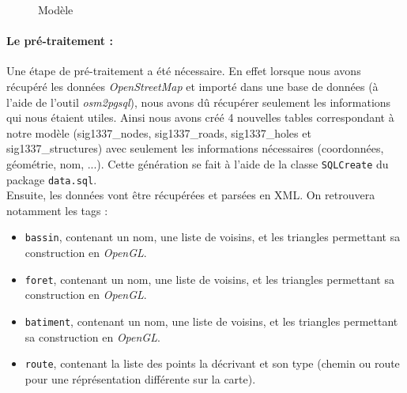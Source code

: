 \documentclass[12pt,a4paper,oneside]{article}
\begin{document}
\begin{figure}[H]
\centering
{}
\caption{Modèle}
\end{figure}

\paragraph{Le pré-traitement : \\}
Une étape de pré-traitement a été nécessaire. En effet lorsque nous avons récupéré les données \textit{OpenStreetMap} et importé dans une base de données (à l'aide de l'outil \textit{osm2pgsql}), nous avons dû récupérer seulement les informations qui nous étaient utiles. Ainsi nous avons créé 4 nouvelles tables correspondant à notre modèle (sig1337\_nodes, sig1337\_roads, sig1337\_holes et sig1337\_structures) avec seulement les informations nécessaires (coordonnées, géométrie, nom, ...). Cette génération se fait à l'aide de la classe \texttt{SQLCreate} du package \texttt{data.sql}. \\
Ensuite, les données vont être récupérées et parsées en XML. On retrouvera notamment les tags :
\begin{itemize}
\item \texttt{bassin}, contenant un nom, une liste de voisins, et les triangles permettant sa construction en \textit{OpenGL}.
\item \texttt{foret}, contenant un nom, une liste de voisins, et les triangles permettant sa construction en \textit{OpenGL}.
\item \texttt{batiment}, contenant un nom, une liste de voisins, et les triangles permettant sa construction en \textit{OpenGL}.
\item \texttt{route}, contenant la liste des points la décrivant et son type (chemin ou route pour une réprésentation différente sur la carte).
\end{itemize}
\end{document}
